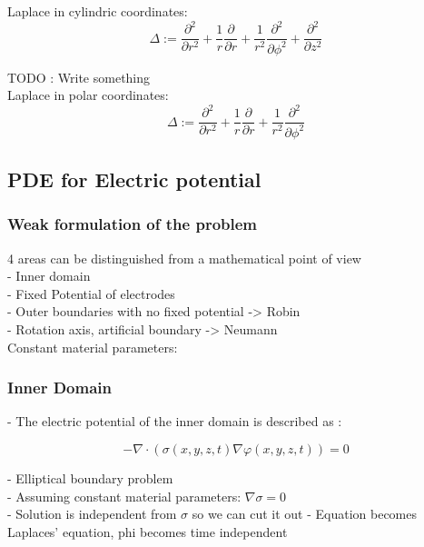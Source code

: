\documentclass[parskip=half, titlepage=yes, 12pt, BCOR=12mm, DIV=calc]{scrartcl}
\begin{document}
Laplace in cylindric coordinates:
\begin{equation}
    \Delta := \frac{\partial^2}{\partial r^2} + \frac{1}{r} \frac{\partial}{\partial r} + \frac{1}{r^2} \frac{\partial^2}{\partial \phi^2} + \frac{\partial^2}{\partial z^2}
\end{equation}

TODO : Write something \\

Laplace in polar coordinates:
\begin{equation}
    \Delta := \frac{\partial^2}{\partial r^2} + \frac{1}{r} \frac{\partial}{\partial r} + \frac{1}{r^2} \frac{\partial^2}{\partial \phi^2}
\end{equation}



\subsection{PDE for Electric potential}

\subsubsection{Weak formulation of the problem}
4 areas can be distinguished from a mathematical point of view \\
- Inner domain \\
- Fixed Potential of electrodes \\
- Outer boundaries with no fixed potential -> Robin \\
- Rotation axis, artificial boundary -> Neumann \\

Constant material parameters: \\

\subsubsection{Inner Domain}

- The electric potential of the inner domain is described as : 

\begin{equation}
    - \nabla \cdot (\sigma(x,y,z,t) \nabla \varphi(x,y,z,t)) = 0
\end{equation}

- Elliptical boundary problem \\
- Assuming constant material parameters: $\nabla \sigma = 0$ \\
- Solution is independent from $\sigma$ so we can cut it out
- Equation becomes Laplaces' equation, phi becomes time independent \\
\end{document}
